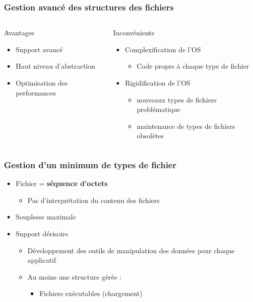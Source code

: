 \begin{frame}
\frametitle{Gestion avancé des structures des fichiers}
\begin{columns}
\begin{block}{Avantages}
\begin{itemize}
\item Support avancé
\item Haut niveau d'abstraction
\item Optimisation des performances
\end{itemize}
\end{block}
\begin{block}{Inconvénients}
\begin{itemize}
\item Complexification de l'OS
\begin{itemize}
\item Code propre à chaque type de fichier
\end{itemize}
\item Rigidification de l'OS
\begin{itemize}
\item nouveaux types de fichiers problématique
\item maintenance de types de fichiers obsolètes
\end{itemize}
\end{itemize}
\end{block}
\end{columns}
\end{frame}


\begin{frame}
\frametitle{Gestion d'un minimum de types de fichier}
\begin{itemize}
\item Fichier = \textbf{séquence d'octets}
\begin{itemize}
\item Pas d'interprétation du contenu des fichiers
\end{itemize}
\item Souplesse maximale
\item Support dérisoire
\begin{itemize}
\item Développement des outils de manipulation des données pour chaque applicatif
\item Au moins une structure gérée :
\begin{itemize}
\item Fichiers exécutables (chargement)
\end{itemize}
\end{itemize}
\end{itemize}
\end{frame}

